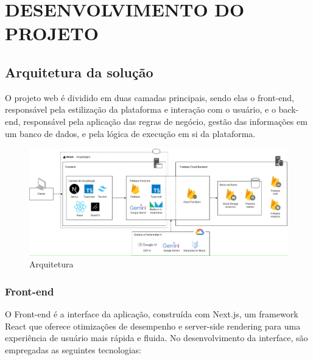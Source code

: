 \chapter{DESENVOLVIMENTO DO PROJETO}
\newpage
\section{Arquitetura da solução}
O projeto web é dividido em duas camadas principais, sendo elas o front-end, responsável pela estilização da plataforma e interação com o usuário, e o back-end, responsável pela aplicação das regras de negócio, gestão das informações em um banco de dados, e pela lógica de execução em si da plataforma.

 \begin{figure}[!htb]
 	    \centering
 	    \caption{\label{logo}Arquitetura}
 	    \includegraphics[width=15cm]{img/infra-model.png}
\end{figure}

\subsection{Front-end}
O Front-end é a interface da aplicação, construída com Next.js, um framework React que oferece otimizações de desempenho e server-side rendering para uma experiência de usuário mais rápida e fluida. No desenvolvimento da interface, são empregadas as seguintes tecnologias:

